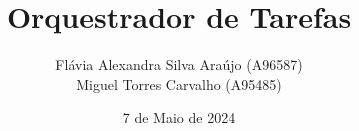 




\title{Orquestrador de Tarefas}

\author{
    Flávia Alexandra Silva Araújo (A96587) \\
  \quad
    Miguel Torres Carvalho (A95485)
}


\date{7 de Maio de 2024}

\newcommand{\Course}{Licenciatura em Engenharia Informática}

\newcommand{\Department}{Escola de Engenharia}

\newcommand{\UniName}{Universidade do Minho}

\newcommand{\UniPic}{\texttt{[image: images/eeum.png]}}

\newcommand{\University}{
    \begin{flushleft}
        \UniPic
    \end{flushleft}
    \textcolor{gray}{\small\textbf{\textsf{\UniName}}}\par
    \textcolor{gray!80!white}{\small{\textsf{\Department}}}\par
    \textcolor{gray!70!white}{\small{\textsf{\Course}}}
}

\newcommand{\UC}{
    \begin{flushleft}
        \par\textcolor{titlepagecolor}{  \LARGE\textbf{\textsf{Unidade Curricular de \\ Sistemas Operativos}}}
    \end{flushleft}
}

